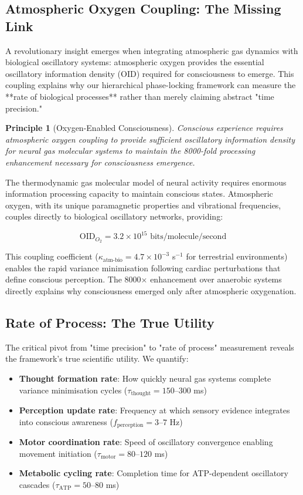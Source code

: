 \documentclass[12pt]{article}
\newtheorem{principle}[theorem]{Principle}
\theoremstyle{remark}
\begin{document}
\subsection{Atmospheric Oxygen Coupling: The Missing Link}

A revolutionary insight emerges when integrating atmospheric gas dynamics with biological oscillatory systems: atmospheric oxygen provides the essential oscillatory information density (OID) required for consciousness to emerge. This coupling explains why our hierarchical phase-locking framework can measure the **rate of biological processes** rather than merely claiming abstract "time precision."

\begin{principle}[Oxygen-Enabled Consciousness]
Conscious experience requires atmospheric oxygen coupling to provide sufficient oscillatory information density for neural gas molecular systems to maintain the 8000-fold processing enhancement necessary for consciousness emergence.
\end{principle}

The thermodynamic gas molecular model of neural activity requires enormous information processing capacity to maintain conscious states. Atmospheric oxygen, with its unique paramagnetic properties and vibrational frequencies, couples directly to biological oscillatory networks, providing:

\begin{equation}
\text{OID}_{O_2} = 3.2 \times 10^{15} \text{ bits/molecule/second}
\end{equation}

This coupling coefficient ($\kappa_{\text{atm-bio}} = 4.7 \times 10^{-3}$ s$^{-1}$ for terrestrial environments) enables the rapid variance minimisation following cardiac perturbations that define conscious perception. The 8000× enhancement over anaerobic systems directly explains why consciousness emerged only after atmospheric oxygenation.

\subsection{Rate of Process: The True Utility}

The critical pivot from "time precision" to "rate of process" measurement reveals the framework's true scientific utility. We quantify:

\begin{itemize}
\item \textbf{Thought formation rate}: How quickly neural gas systems complete variance minimisation cycles ($\tau_{\text{thought}} = 150$--$300$ ms)
\item \textbf{Perception update rate}: Frequency at which sensory evidence integrates into conscious awareness ($f_{\text{perception}} = 3$--$7$ Hz)
\item \textbf{Motor coordination rate}: Speed of oscillatory convergence enabling movement initiation ($\tau_{\text{motor}} = 80$--$120$ ms)
\item \textbf{Metabolic cycling rate}: Completion time for ATP-dependent oscillatory cascades ($\tau_{\text{ATP}} = 50$--$80$ ms)
\end{itemize}
\end{document}
